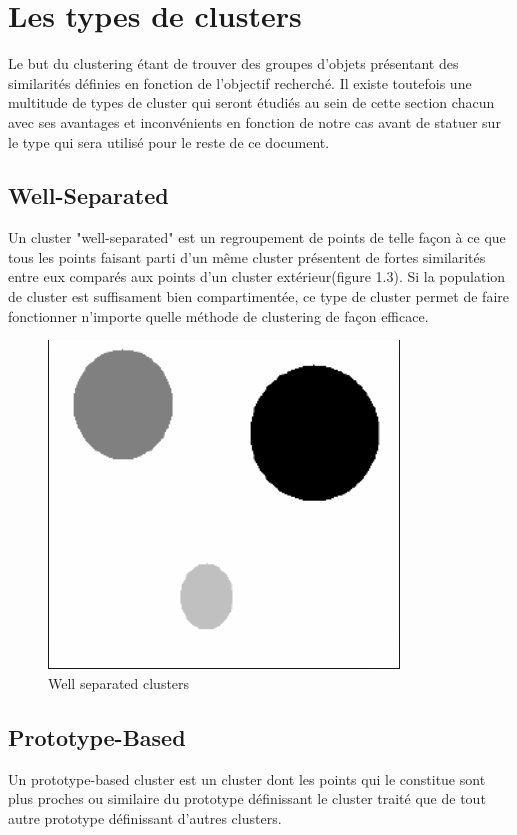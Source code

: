\documentclass[memoire.tex]{subfiles}
\begin{document}
\section{Les types de clusters}

Le but du clustering étant de trouver des groupes d'objets présentant des similarités
définies en fonction de l'objectif recherché. Il existe toutefois une multitude de types de cluster qui seront étudiés au sein de cette section chacun avec ses avantages et inconvénients en fonction de notre cas avant de statuer sur le type qui sera utilisé pour le reste de ce document.

\subsection{Well-Separated}
Un cluster "well-separated" est un regroupement de points de telle façon à ce que tous les points faisant parti d'un même cluster présentent de fortes similarités entre eux comparés aux points d'un cluster extérieur(figure 1.3). Si la population de cluster est suffisament bien compartimentée, ce type de cluster permet de faire fonctionner n'importe quelle méthode de clustering de façon efficace.
	\begin{figure}[h!]
		\centerline{\includegraphics[scale=0.8]{img/well_separated.png}}
		\caption{Well separated clusters}
	\end{figure}

\subsection{Prototype-Based}
Un prototype-based cluster est un cluster dont les points qui le constitue sont plus proches ou similaire du prototype définissant le cluster traité que de tout autre prototype définissant d'autres clusters.
\end{document}

